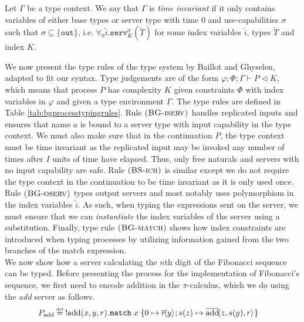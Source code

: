 \begin{defi}\label{def:timeinvariance}
Let $\Gamma$ be a type context. We say that $\Gamma$ is \textit{time invariant} if it only contains variables of either base types or server type with time $0$ and use-capabilities $\sigma$ such that $\sigma\subseteq\{\texttt{out}\}$, i.e. $\forall_0\widetilde{i}.\texttt{serv}^{\sigma}_K(\widetilde{T})$ for some index variables $\widetilde{i}$, types $\widetilde{T}$ and index $K$.
\end{defi}

We now present the type rules of the type system by Baillot and Ghyselen, adapted to fit our syntax. Type judgements are of the form $\varphi;\Phi;\Gamma \vdash P \triangleleft K$, which means that process $P$ has complexity $K$ given constraints $\Phi$ with index variables in $\varphi$ and given a type environment $\Gamma$. The type rules are defined in Table \ref{tab:bgprocesstypingrules}. Rule $\mbox{\textsc{\protect{(BG-iserv})}}$ handles replicated inputs and ensures that name $a$ is bound to a server type with input capability in the type context. We must also make sure that in the continuation $P$, the type context must be time invariant as the replicated input may be invoked any number of times after $I$ units of time have elapsed. Thus, only free naturals and servers with no input capability are safe. Rule $\mbox{\textsc{\protect{(BS-ich})}}$ is similar except we do not require the type context in the continuation to be time invariant as it is only used once. Rule $\mbox{\textsc{\protect{(BG-oserv})}}$ types output servers and most notably uses polymorphism in the index variables $\widetilde{i}$. As such, when typing the expressions sent on the server, we must ensure that we can \textit{instantiate} the index variables of the server using a substitution. Finally, type rule $\mbox{\textsc{\protect{(BG-match})}}$ shows how index constraints are introduced when typing processes by utilizing information gained from the two branches of the match expression.\\

We now show how a server calculating the $n$th digit of the Fibonacci sequence can be typed. Before presenting the process for the implementation of Fibonacci's sequence, we first need to encode addition in the $\pi$-calculus, which we do using the \textit{add} server as follows.
%
\begin{align*}
    P_\text{add}\defeq&\;\bang\inputch{\text{add}}{x,y,r}{}{
        \texttt{match}\; x\; \{
             0 \mapsto \asyncoutputch{r}{y}{};
            \succc{z} \mapsto \asyncoutputch{\text{add}}{z,\succc{y},r}{}\}}
\end{align*}

